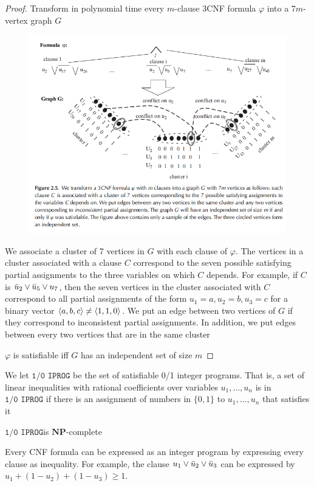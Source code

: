 \documentclass[11pt]{article}
\def \NP {\textbf{NP}}
\def \NP {\textbf{NP}}
\def \ZOIPROG {\texttt{1/0 IPROG}}
\begin{document}
\begin{proof}
Transform in polynomial time every \(m\)-clause 3CNF formula \(\varphi\) into a \(7m\)-vertex graph \(G\)

\begin{figure}[htbp]
\centering
\includegraphics[width=.9\linewidth]{../images/ComputationalComplexity/7.png}
\end{figure}

We associate a cluster of 7 vertices in \(G\) with each clause of \(\varphi\). The vertices in a cluster
associated with a clause \(C\) correspond to the seven possible satisfying partial assignments
to the three variables on which \(C\) depends. For example, if \(C\)
is \(\bar{u}_2\vee\bar{u}_5\vee u_7\), then the seven vertices in the cluster associated with \(C\)
correspond to all partial assignments of the form \(u_1=a,u_2=b,u_3=c\) for a binary
vector \(\langle a,b,c\rangle\neq\langle1,1,0\rangle\). We put an edge between two vertices of \(G\) if they
correspond to inconsistent partial assignments. In addition, we put edges between every two
vertices that are in the same cluster

\(\varphi\) is satisfiable iff \(G\) has an independent set of size \(m\)
\end{proof}

We let \(\ZOIPROG\) be the set of satisfiable 0/1 integer programs.
That is, a set of linear inequalities with rational coefficients over
variables \(u_1,\dots,u_n\) is in \(\ZOIPROG\) if there is an assignment of numbers in \(\{0,1\}\)
to \(u_1,\dots,u_n\) that satisfies it

\begin{theorem}[]
\(\ZOIPROG\)is \(\NP\)-complete

Every CNF formula can be expressed as an integer program by expressing every clause as
inequality. For example, the clause \(u_1\vee\bar{u}_2\vee\bar{u}_3\) can be expressed by
\(u_1+(1-u_2)+(1-u_3)\ge1\).
\end{theorem}
\end{document}

